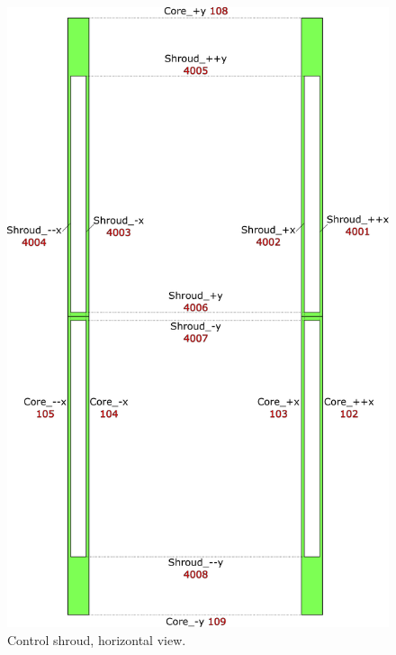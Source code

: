 \documentclass{UWNR_modeling}
\begin{document}
\begin{figure}[H]
  \centering
  \includegraphics[width=5.5in]{CS_xy.pdf}
  \caption{Control shroud, horizontal view.}
  \label{fig:CS_xy}
\end{figure}
\end{document}
